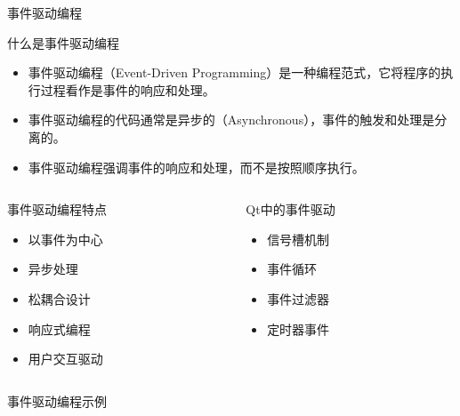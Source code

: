 \documentclass[UTF8,aspectratio=169]{beamer}
\begin{document}
\begin{frame}{事件驱动编程}
    \begin{ytublock}{什么是事件驱动编程}
        \begin{itemize}
            \item 事件驱动编程（Event-Driven Programming）是一种编程范式，它将程序的执行过程看作是事件的响应和处理。
            \item 事件驱动编程的代码通常是异步的（Asynchronous），事件的触发和处理是分离的。
            \item 事件驱动编程强调事件的响应和处理，而不是按照顺序执行。
        \end{itemize}
    \end{ytublock}
    \begin{columns}
        \begin{column}{0.48\textwidth}
            \begin{ytublock}{事件驱动编程特点}
                \begin{itemize}
                    \item 以事件为中心
                    \item 异步处理
                    \item 松耦合设计
                    \item 响应式编程
                    \item 用户交互驱动
                \end{itemize}
            \end{ytublock}
        \end{column}
        \begin{column}{0.48\textwidth}
            \begin{ytublock}{Qt中的事件驱动}
                \begin{itemize}
                    \item 信号槽机制
                    \item 事件循环
                    \item 事件过滤器
                    \item 定时器事件
                \end{itemize}
            \end{ytublock}
        \end{column}
    \end{columns}
\end{frame}

\begin{frame}[fragile]{事件驱动编程示例}
    \begin{columns}
        \begin{column}{0.48\textwidth}
            \inputminted[firstline=1,lastline=18]{cpp}{code/event_driven_programming.cpp}
        \end{column}
        \begin{column}{0.48\textwidth}
            \inputminted[firstline=19,lastline=32]{cpp}{code/event_driven_programming.cpp}
        \end{column}
    \end{columns}
\end{frame}
\end{document}
